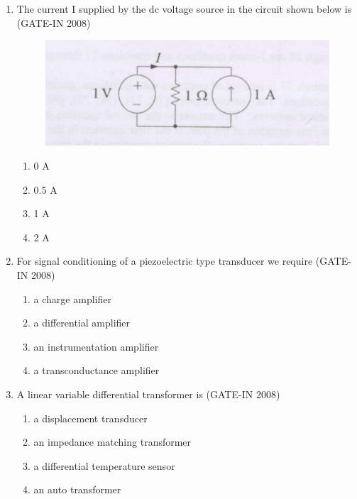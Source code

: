 \documentclass[journal,12pt,onecolumn]{IEEEtran}
\theoremstyle{remark}
\begin{document}
\begin{enumerate}
    \item  The current I supplied by the dc voltage source in the circuit shown below is  \hfill{(GATE-IN 2008)}

 \begin{figure}[H]
    \centering
    \includegraphics[width=0.5\columnwidth]{figs/i2.jpg}
    \caption{}
    \label{fig:placeholder2}
\end{figure}
\begin{multicols}{4}
    \begin{enumerate} 
        \item  0 A
        \item  0.5 A
        \item  1 A
        \item  2 A
    \end{enumerate}
    \end{multicols}
    \item For signal conditioning of a piezoelectric type transducer we require \hfill{(GATE-IN 2008)}
    \begin{multicols}{2}
    \begin{enumerate}
        \item a charge amplifier 
        \item  a differential amplifier
        \item  an instrumentation amplifier
        \item  a transconductance amplifier
    \end{enumerate}
    \end{multicols}
    
    \item A linear variable differential transformer  is \hfill{(GATE-IN 2008)}
    \begin{multicols}{2}
    \begin{enumerate} 
        \item a displacement transducer 
        \item an impedance matching transformer
        \item a differential temperature sensor
        \item an auto transformer
    \end{enumerate}
    \end{multicols}
    

\end{enumerate}
\end{document}

